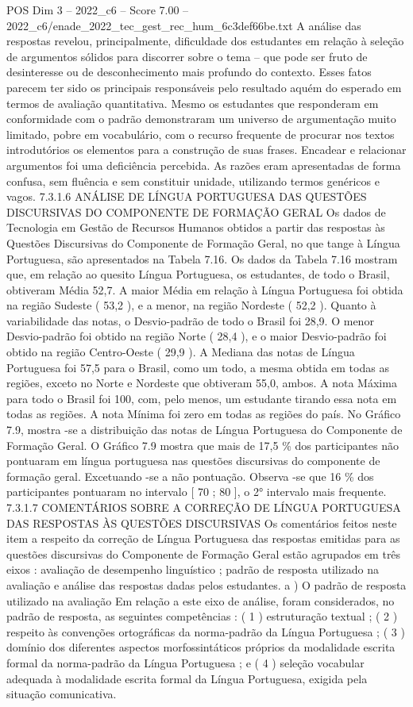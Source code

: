 \begin{textsample}{POS Dim 3 – 2022\_c6 – Score 7.00 – 2022\_c6/enade\_2022\_tec\_gest\_rec\_hum\_6c3def66be.txt}
A análise das respostas revelou, principalmente, dificuldade dos estudantes em relação à seleção de argumentos sólidos para discorrer sobre o tema – que pode ser fruto de desinteresse ou de desconhecimento mais profundo do contexto.
Esses fatos parecem ter sido os principais responsáveis pelo resultado aquém do esperado em termos de avaliação quantitativa.
Mesmo os estudantes que responderam em conformidade com o padrão demonstraram um universo de argumentação muito limitado, pobre em vocabulário, com o recurso frequente de procurar nos textos introdutórios os elementos para a construção de suas frases.
Encadear e relacionar argumentos foi uma deficiência percebida.
As razões eram apresentadas de forma confusa, sem fluência e sem constituir unidade, utilizando termos genéricos e vagos. 7.3.1.6 ANÁLISE DE LÍNGUA PORTUGUESA DAS QUESTÕES DISCURSIVAS DO COMPONENTE DE FORMAÇÃO GERAL Os dados de Tecnologia em Gestão de Recursos Humanos obtidos a partir das respostas às Questões Discursivas do Componente de Formação Geral, no que tange à Língua Portuguesa, são apresentados na Tabela 7.16.
Os dados da Tabela 7.16 mostram que, em relação ao quesito Língua Portuguesa, os estudantes, de todo o Brasil, obtiveram Média 52,7.
A maior Média em relação à Língua Portuguesa foi obtida na região Sudeste ( 53,2 ), e a menor, na região Nordeste ( 52,2 ).
Quanto à variabilidade das notas, o Desvio-padrão de todo o Brasil foi 28,9.
O menor Desvio-padrão foi obtido na região Norte ( 28,4 ), e o maior Desvio-padrão foi obtido na região Centro-Oeste ( 29,9 ).
A Mediana das notas de Língua Portuguesa foi 57,5 para o Brasil, como um todo, a mesma obtida em todas as regiões, exceto no Norte e Nordeste que obtiveram 55,0, ambos.
A nota Máxima para todo o Brasil foi 100, com, pelo menos, um estudante tirando essa nota em todas as regiões.
A nota Mínima foi zero em todas as regiões do país.
No Gráfico 7.9, mostra -se a distribuição das notas de Língua Portuguesa do Componente de Formação Geral.
O Gráfico 7.9 mostra que mais de 17,5 \% dos participantes não pontuaram em língua portuguesa nas questões discursivas do componente de formação geral.
Excetuando -se a não pontuação.
Observa -se que 16 \% dos participantes pontuaram no intervalo [ 70 ; 80 ], o 2{\EmojiFont °} intervalo mais frequente. 7.3.1.7 COMENTÁRIOS SOBRE A CORREÇÃO DE LÍNGUA PORTUGUESA DAS RESPOSTAS ÀS QUESTÕES DISCURSIVAS Os comentários feitos neste item a respeito da correção de Língua Portuguesa das respostas emitidas para as questões discursivas do Componente de Formação Geral estão agrupados em três eixos : avaliação de desempenho linguístico ; padrão de resposta utilizado na avaliação e análise das respostas dadas pelos estudantes. a ) O padrão de resposta utilizado na avaliação Em relação a este eixo de análise, foram considerados, no padrão de resposta, as seguintes competências : ( 1 ) estruturação textual ; ( 2 ) respeito às convenções ortográficas da norma-padrão da Língua Portuguesa ; ( 3 ) domínio dos diferentes aspectos morfossintáticos próprios da modalidade escrita formal da norma-padrão da Língua Portuguesa ; e ( 4 ) seleção vocabular adequada à modalidade escrita formal da Língua Portuguesa, exigida pela situação comunicativa.

\end{textsample}
